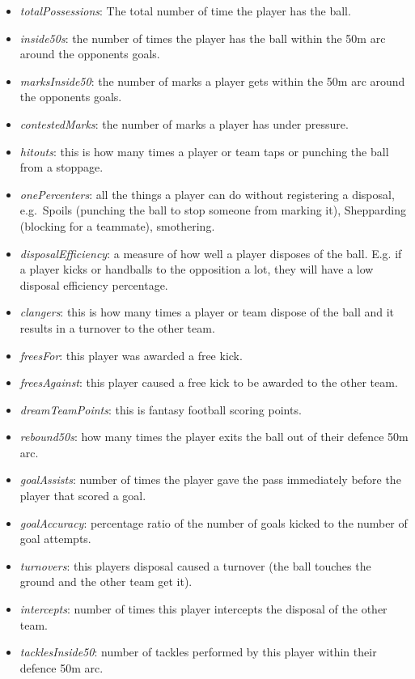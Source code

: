 \begin{itemize}
\item
  \emph{totalPossessions}: The total number of time the player has the ball.
\item
  \emph{inside50s}: the number of times the player has the ball within the 50m arc around the opponents goals.
\item
  \emph{marksInside50}: the number of marks a player gets within the 50m arc around the opponents goals.
\item
  \emph{contestedMarks}: the number of marks a player has under pressure.
\item
  \emph{hitouts}: this is how many times a player or team taps or punching the ball from a stoppage.
\item
  \emph{onePercenters}: all the things a player can do without registering a disposal, e.g.~Spoils (punching the ball to stop someone from marking it), Shepparding (blocking for a teammate), smothering.
\item
  \emph{disposalEfficiency}: a measure of how well a player disposes of the ball. E.g. if a player kicks or handballs to the opposition a lot, they will have a low disposal efficiency percentage.
\item
  \emph{clangers}: this is how many times a player or team dispose of the ball and it results in a turnover to the other team.
\item
  \emph{freesFor}: this player was awarded a free kick.
\item
  \emph{freesAgainst}: this player caused a free kick to be awarded to the other team.
\item
  \emph{dreamTeamPoints}: this is fantasy football scoring points.
\item
  \emph{rebound50s}: how many times the player exits the ball out of their defence 50m arc.
\item
  \emph{goalAssists}: number of times the player gave the pass immediately before the player that scored a goal.
\item
  \emph{goalAccuracy}: percentage ratio of the number of goals kicked to the number of goal attempts.
\item
  \emph{turnovers}: this players disposal caused a turnover (the ball touches the ground and the other team get it).
\item
  \emph{intercepts}: number of times this player intercepts the disposal of the other team.
\item
  \emph{tacklesInside50}: number of tackles performed by this player within their defence 50m arc.

\end{itemize}
